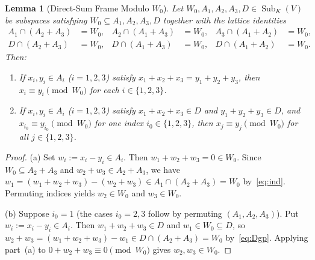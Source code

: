 \documentclass[11pt]{article}
\newtheorem{lemma}[theorem]{Lemma}
\theoremstyle{definition}
\newcommand{\Sub}{\operatorname{Sub}}
\begin{document}
\begin{lemma}[Direct-Sum Frame Modulo $W_0$]\label{lem:frame}
Let $W_0, A_1, A_2, A_3, D \in \Sub_K(V)$ be subspaces satisfying
$W_0 \subseteq A_1, A_2, A_3, D$ together with the lattice identities
\begin{align}
  A_1 \cap (A_2 + A_3) &= W_0, &
  A_2 \cap (A_1 + A_3) &= W_0, &
  A_3 \cap (A_1 + A_2) &= W_0, \label{eq:ind}\\
  D \cap (A_2 + A_3) &= W_0, &
  D \cap (A_1 + A_3) &= W_0, &
  D \cap (A_1 + A_2) &= W_0. \label{eq:Dgp}
\end{align}
Then:
\begin{enumerate}
  \item[\textup{(a)}] If $x_i, y_i \in A_i$ ($i = 1, 2, 3$) satisfy
  $x_1 + x_2 + x_3 = y_1 + y_2 + y_3$, then $x_i \equiv y_i \pmod{W_0}$ for each
  $i \in \{1, 2, 3\}$.
  \item[\textup{(b)}] If $x_i, y_i \in A_i$ ($i = 1, 2, 3$) satisfy
  $x_1 + x_2 + x_3 \in D$ and $y_1 + y_2 + y_3 \in D$, and $x_{i_0} \equiv y_{i_0}
  \pmod{W_0}$ for \emph{one} index $i_0 \in \{1, 2, 3\}$, then $x_j \equiv y_j
  \pmod{W_0}$ for \emph{all} $j \in \{1, 2, 3\}$.
\end{enumerate}
\end{lemma}
\begin{proof}
(a) Set $w_i := x_i - y_i \in A_i$. Then $w_1 + w_2 + w_3 = 0 \in W_0$. Since
$W_0 \subseteq A_2 + A_3$ and $w_2 + w_3 \in A_2 + A_3$, we have
$w_1 = (w_1 + w_2 + w_3) - (w_2 + w_3) \in A_1 \cap (A_2 + A_3) = W_0$ by~\eqref{eq:ind}.
Permuting indices yields $w_2 \in W_0$ and $w_3 \in W_0$.

(b) Suppose $i_0 = 1$ (the cases $i_0 = 2, 3$ follow by permuting $(A_1, A_2, A_3)$).
Put $w_i := x_i - y_i \in A_i$. Then $w_1 + w_2 + w_3 \in D$ and $w_1 \in W_0 \subseteq D$,
so $w_2 + w_3 = (w_1 + w_2 + w_3) - w_1 \in D \cap (A_2 + A_3) = W_0$ by~\eqref{eq:Dgp}.
Applying part~(a) to $0 + w_2 + w_3 \equiv 0 \pmod{W_0}$ gives $w_2, w_3 \in W_0$.
\end{proof}
\end{document}
